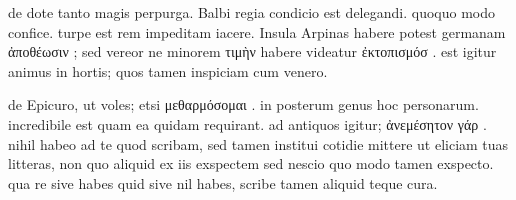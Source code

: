


 de dote tanto magis perpurga. Balbi regia condicio est delegandi. quoquo modo confice. turpe est rem impeditam iacere. Insula Arpinas habere potest germanam ἀποθέωσιν ; sed vereor ne minorem τιμὴν habere videatur ἐκτοπισμόσ . est igitur animus in hortis; quos tamen inspiciam cum venero.

 de Epicuro, ut voles; etsi μεθαρμόσομαι . in posterum genus hoc personarum. incredibile est quam ea quidam requirant. ad antiquos igitur; ἀνεμέσητον γάρ . nihil habeo ad te quod scribam, sed tamen institui cotidie mittere ut eliciam tuas litteras, non quo aliquid ex iis exspectem sed nescio quo modo tamen exspecto. qua re sive habes quid sive nil habes, scribe tamen aliquid teque cura.
